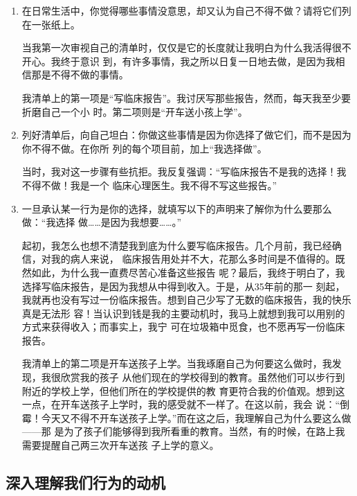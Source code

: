 \documentclass{ctexart}
\begin{document}
\begin{enumerate}[label=第\chinese*步,font=\bfseries]
	\item 在日常生活中，你觉得哪些事情没意思，却又认为自己不得不做？请将它们列在一张纸上。

	      当我第一次审视自己的清单时，仅仅是它的长度就让我明白为什么我活得很不开心。我终于意识
	      到，有许多事情，我之所以日复一日地去做，是因为我相信那是不得不做的事情。

	      我清单上的第一项是``写临床报告''。我讨厌写那些报告，然而，每天我至少要折磨自己一个小
	      时。第二项则是``开车送小孩上学''。
	\item 列好清单后，向自己坦白：你做这些事情是因为你选择了做它们，而不是因为你不得不做。在你所
	      列的每个项目前，加上``我选择做''。

	      当时，我对这一步骤有些抗拒。我反复强调：``写临床报告不是我的选择！我不得不做！我是一个
	      临床心理医生。我不得不写这些报告。''

	\item 一旦承认某一行为是你的选择，就填写以下的声明来了解你为什么要那么做：``我选择
	      做\ldots \ldots 是因为我想要\ldots \ldots 。''

	      起初，我怎么也想不清楚我到底为什么要写临床报告。几个月前，我已经确信，对我的病人来说，
	      临床报告用处并不大，花那么多时间是不值得的。既然如此，为什么我一直费尽苦心准备这些报告
	      呢？最后，我终于明白了，我选择写临床报告，是因为我想从中得到收入。于是，从35年前的那一
	      刻起，我就再也没有写过一份临床报告。想到自己少写了无数的临床报告，我的快乐真是无法形
	      容！当认识到钱是我的主要动机时，我马上就想到我可以用别的方式来获得收入；而事实上，我宁
	      可在垃圾箱中觅食，也不愿再写一份临床报告。

	      我清单上的第二项是开车送孩子上学。当我琢磨自己为何要这么做时，我发现，我很欣赏我的孩子
	      从他们现在的学校得到的教育。虽然他们可以步行到附近的学校上学，但他们所在的学校提供的教
	      育更符合我的价值观。想到这一点，在开车送孩子上学时，我的感受就不一样了。在这以前，我会
	      说：``倒霉！今天又不得不开车送孩子上学。''而在这之后，我理解自己为什么要这么做------那
	      是为了孩子们能够得到我所看重的教育。当然，有的时候，在路上我需要提醒自己两三次开车送孩
	      子上学的意义。
\end{enumerate}


\subsection{深入理解我们行为的动机}
\end{document}

